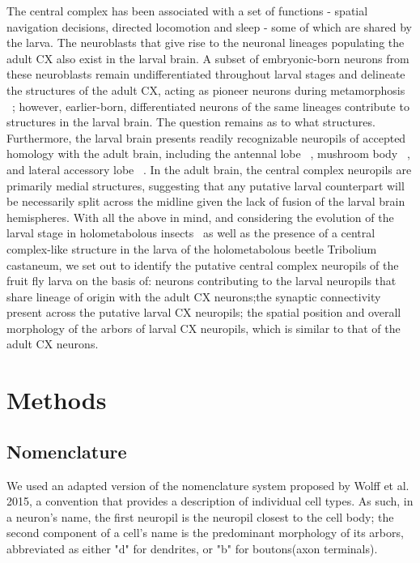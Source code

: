 \documentclass{article}
\begin{document}
The central complex has been associated with a set of functions - spatial navigation decisions, directed locomotion and sleep %
- some of which are shared by the larva. The neuroblasts that give rise to the neuronal lineages populating the adult CX also exist in the larval brain. A subset of embryonic-born neurons from these neuroblasts remain undifferentiated throughout larval stages and delineate the structures of the adult CX, acting as pioneer neurons during metamorphosis 
~\citep{andrade2019developmentally}; however, earlier-born, differentiated neurons of the same lineages contribute to structures in the larval brain. The question remains as to what structures. Furthermore, the larval brain presents readily recognizable neuropils of accepted homology with the adult brain, including the antennal lobe ~\citep{berck2016wiring}, mushroom body ~\citep{eichler2017complete}, and lateral accessory lobe ~\citep{hartenstein2015lineage}.
 In the adult brain, the central complex neuropils are primarily medial structures, suggesting that any putative larval counterpart will be necessarily split across the midline given the lack of fusion of the larval brain hemispheres. With all the above in mind, and considering the evolution of the larval stage in holometabolous insects ~\citep{truman1999origins}as well as the presence of a central complex-like structure in the larva of the holometabolous beetle Tribolium castaneum, we set out to identify the putative central complex neuropils of the fruit fly larva on the basis of: neurons contributing to the larval neuropils that share lineage of origin with the adult CX neurons;the synaptic connectivity present across the putative larval CX neuropils; the spatial position and overall morphology of the arbors of larval CX neuropils, which is similar to that of the adult CX neurons. 


\section{Methods}
 \subsection{Nomenclature}
 We used an adapted version of the nomenclature system proposed by Wolff et al. 2015, a convention that provides a description of individual cell types. As such, in a neuron's name, the first neuropil is the neuropil closest to the cell body; the second component of a cell’s name is the predominant morphology of its arbors, abbreviated as either "d" for dendrites, or "b" for boutons(axon terminals). 
 
\end{document}
